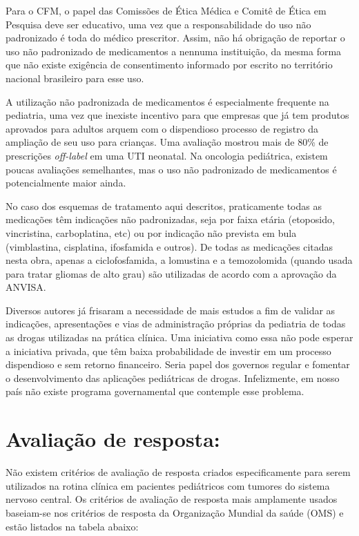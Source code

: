 \documentclass[11pt,a4paper,oldfontcommands]{memoir}
\begin{document}
Para o CFM, o papel das Comissões de Ética Médica e Comitê de Ética em Pesquisa deve ser educativo, uma vez que a responsabilidade do uso não padronizado é toda do médico prescritor. Assim, não há obrigação de reportar o uso não padronizado de medicamentos a nennuma instituição, da mesma forma que não existe exigência de consentimento informado por escrito no território nacional brasileiro para esse uso.

A utilização não padronizada de medicamentos é especialmente frequente na pediatria, uma vez que inexiste incentivo para que empresas que já tem produtos aprovados para adultos arquem com o dispendioso processo de registro da ampliação de seu uso para crianças. \cite{10.1001/archpedi.161.3.282} Uma avaliação mostrou mais de 80\% de prescrições \textit{off-label} em uma UTI neonatal. \cite{CARVALHO2012} Na oncologia pediátrica, existem poucas avaliações semelhantes, mas o uso não padronizado de medicamentos é potencialmente maior ainda. \cite{pmid21453298,10.1111/jcpt.12507}

No caso dos esquemas de tratamento aqui descritos, praticamente todas as medicações têm indicações não padronizadas, seja por faixa etária (etoposido, vincristina, carboplatina, etc) ou por indicação não prevista em bula (vimblastina, cisplatina, ifosfamida e outros). De todas as medicações citadas nesta obra, apenas a ciclofosfamida, a lomustina e a temozolomida (quando usada para tratar gliomas de alto grau) são utilizadas de acordo com a aprovação da ANVISA.

Diversos autores já frisaram a necessidade de mais estudos a fim de validar as indicações, apresentações e vias de administração próprias da pediatria de todas as drogas utilizadas na prática clínica. Uma iniciativa como essa não pode esperar a iniciativa privada, que têm baixa probabilidade de investir em um processo dispendioso e sem retorno financeiro. Seria papel dos governos regular e fomentar o desenvolvimento das aplicações pediátricas de drogas. Infelizmente, em nosso país não existe programa governamental que contemple esse problema.

\section{Avaliação de resposta:}

Não existem critérios de avaliação de resposta criados especificamente para serem utilizados na rotina clínica em pacientes pediátricos com tumores do sistema nervoso central. Os critérios de avaliação de resposta mais amplamente usados baseiam-se nos critérios de resposta da Organização Mundial da saúde (OMS)\cite{10.1093/jnci/92.3.205} e estão listados na tabela abaixo:
\end{document}
